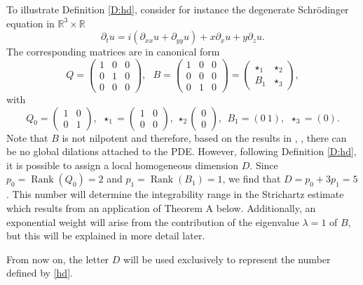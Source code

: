 \documentclass[11pt,letter]{amsart}
\def \R {\mathbb{R}}
\newcommand{\p}{\partial}
\newcommand{\la}{\lambda}
\numberwithin{equation}{section}
\numberwithin{equation}{section}
\begin{document}
\noindent To illustrate Definition \ref{D:hd}, consider for instance the degenerate Schr\"odinger equation in $\R^3\times \R$
\begin{equation*}
\p_t u = i (\p_{xx} u + \p_{yy} u) + x \p_x u + y \p_z u.
\end{equation*}
The corresponding matrices are in canonical form
\begin{equation}\label{ex}
Q = \begin{pmatrix} 1 & 0 & 0 \\ 0 & 1 & 0\\ 0 & 0 & 0 \end{pmatrix},\ \ \ B = \begin{pmatrix} 1 & 0 & 0 \\ 0 & 0 & 0\\ 0 & 1 & 0 \end{pmatrix} = \begin{pmatrix} \star_1 & \star_2\\ B_1& \star_3\end{pmatrix},
\end{equation}
with 
\[
Q_0 = \begin{pmatrix} 1 & 0 \\ 0 & 1\end{pmatrix},\ \ \star_1 = \begin{pmatrix} 1 & 0 \\ 0 & 0\end{pmatrix}, \ \star_2 \begin{pmatrix} 0 \\ 0\end{pmatrix},\ \ B_1 = (0\ 1),\ \ \star_3 = (0).
\]
Note that $B$ is not nilpotent and therefore, based on the results in \cite{Ka2}, \cite{LP}, there can be no global dilations attached to the PDE. 
However, following Definition \ref{D:hd}, it is possible to assign a local homogeneous dimension $D$. Since $p_0 = \operatorname{Rank}(Q_0)= 2$ and $p_1 = \operatorname{Rank}(B_1)= 1$, we find that $D = p_0 + 3 p_1 = 5$. 
This number will determine the integrability range in the Strichartz estimate which results from an application of Theorem A below. Additionally, an exponential weight will arise from the contribution of the eigenvalue $\la =1$ of $B$, but this will be explained in more detail later.



\medskip


\noindent From now on, the letter $D$ will be used exclusively to represent the number defined by \eqref{hd}. 
\end{document}
